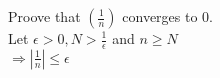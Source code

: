 \documentclass{article}
\begin{document}
\noindent Proove that $(\frac{1}{n})$ converges to 0.\\
Let $\epsilon > 0, N > \frac{1}{\epsilon} $ and $ n \geq N$\\
$\Rightarrow  |\frac{1}{n}| \leq \epsilon$
\end{document}
